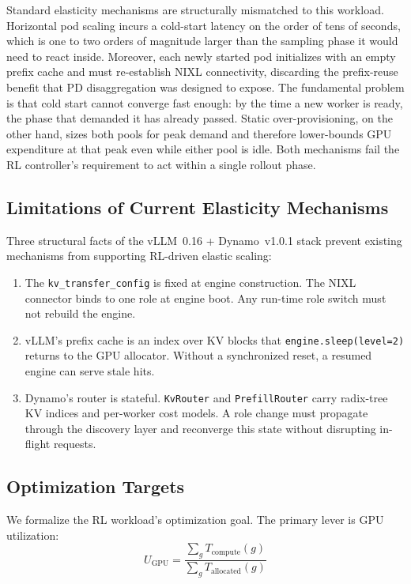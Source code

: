 \documentclass[10pt,twocolumn,letterpaper]{article}
\begin{document}
Standard elasticity mechanisms are structurally mismatched to this workload. Horizontal pod scaling incurs a cold-start latency on the order of tens of seconds, which is one to two orders of magnitude larger than the sampling phase it would need to react inside. Moreover, each newly started pod initializes with an empty prefix cache and must re-establish NIXL connectivity, discarding the prefix-reuse benefit that PD disaggregation was designed to expose. The fundamental problem is that cold start cannot converge fast enough: by the time a new worker is ready, the phase that demanded it has already passed. Static over-provisioning, on the other hand, sizes both pools for peak demand and therefore lower-bounds GPU expenditure at that peak even while either pool is idle. Both mechanisms fail the RL controller's requirement to act within a single rollout phase.

\subsection{Limitations of Current Elasticity Mechanisms}
\label{sec:limitations}

Three structural facts of the vLLM~0.16 + Dynamo~v1.0.1 stack prevent existing mechanisms from supporting RL-driven elastic scaling:

\begin{enumerate}[nosep]
\item The \texttt{kv\_transfer\_config} is fixed at engine construction. The NIXL connector binds to one role at engine boot. Any run-time role switch must not rebuild the engine.
\item vLLM's prefix cache is an index over KV blocks that \texttt{engine.sleep(level=2)} returns to the GPU allocator. Without a synchronized reset, a resumed engine can serve stale hits.
\item Dynamo's router is stateful. \texttt{KvRouter} and \texttt{PrefillRouter} carry radix-tree KV indices and per-worker cost models. A role change must propagate through the discovery layer and reconverge this state without disrupting in-flight requests.
\end{enumerate}

\subsection{Optimization Targets}
\label{sec:opt-targets}

We formalize the RL workload's optimization goal. The primary lever is GPU utilization:
\begin{equation}
U_{\text{GPU}} = \frac{\sum_g T_{\text{compute}}(g)}{\sum_g T_{\text{allocated}}(g)}
\label{eq:ugpu}
\end{equation}
\end{document}
